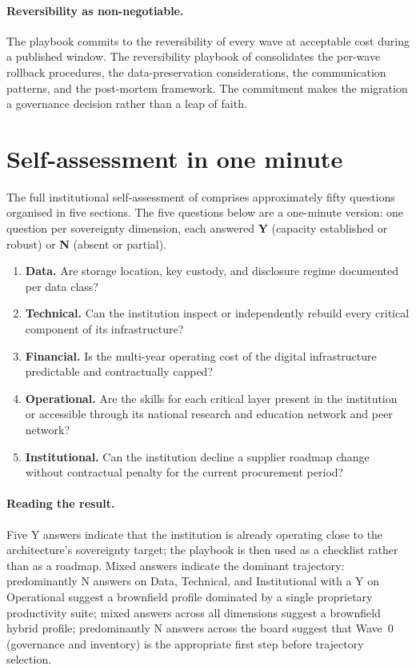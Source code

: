 \paragraph{Reversibility as non-negotiable.} The playbook commits
to the reversibility of every wave at acceptable cost during a
published window. The reversibility playbook of
 consolidates the per-wave rollback
procedures, the data-preservation considerations, the
communication patterns, and the post-mortem framework. The
commitment makes the migration a governance decision rather than
a leap of faith.

\section{Self-assessment in one minute}
\label{sec:synth-self-assessment}

The full institutional self-assessment of
 comprises approximately fifty
questions organised in five sections. The five questions below
are a one-minute version: one question per sovereignty dimension,
each answered \textbf{Y} (capacity established or robust) or
\textbf{N} (absent or partial).

\begin{enumerate}[leftmargin=2em,nosep]
  \item \textbf{Data.} Are storage location, key custody, and
    disclosure regime documented per data class?
  \item \textbf{Technical.} Can the institution inspect or
    independently rebuild every critical component of its
    infrastructure?
  \item \textbf{Financial.} Is the multi-year operating cost of
    the digital infrastructure predictable and contractually
    capped?
  \item \textbf{Operational.} Are the skills for each critical
    layer present in the institution or accessible through its
    national research and education network and peer network?
  \item \textbf{Institutional.} Can the institution decline a
    supplier roadmap change without contractual penalty for the
    current procurement period?
\end{enumerate}

\paragraph{Reading the result.} Five Y answers indicate that the
institution is already operating close to the architecture's
sovereignty target; the playbook is then used as a checklist
rather than as a roadmap. Mixed answers indicate the dominant
trajectory: predominantly N answers on Data, Technical, and
Institutional with a Y on Operational suggest a brownfield
profile dominated by a single proprietary productivity suite;
mixed answers across all dimensions
suggest a brownfield hybrid profile; predominantly N answers
across the board suggest that Wave~0 (governance and inventory)
is the appropriate first step before trajectory selection.

